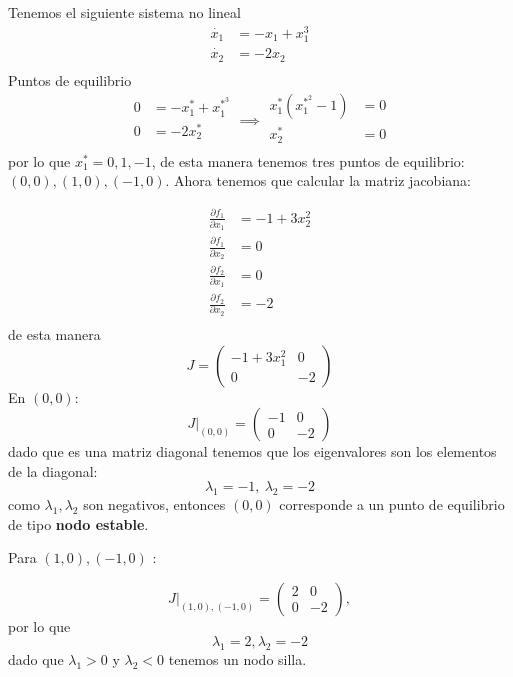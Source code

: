 \begin{ejemplo} \label{ejemplo lin6 1} 
  Tenemos el siguiente sistema no lineal
  $$
  \begin{aligned}
    \dot{x_1} &= -x_1+x_1^3 \\ 
    \dot{x_2} &= -2x_2 \\ 
  \end{aligned}
  $$
  Puntos de equilibrio
  $$
  \begin{aligned}
    0 &= -x_1^*+x_1^{*^3}\\
    0 &= -2x_2^{{*}} \\
  \end{aligned}
  \implies \begin{aligned}
    x_1^{{*}}(x_1^{{*}^2}-1) &= 0 \\ 
    x_2^{{*}} &= 0 \\ 
  \end{aligned}
  $$
  por lo que $x_1^*=0,1,-1$, de esta manera tenemos tres puntos de equilibrio: $(0,0),(1,0),(-1,0).$ Ahora tenemos que calcular la matriz jacobiana:

  $$
  \begin{aligned}
    \frac{\partial f_1}{\partial x_1} &=  -1 + 3x_2^2 \\
    \frac{\partial f_1}{\partial x_2} &= 0 \\ 
    \frac{\partial f_2}{\partial x_1} &= 0 \\ 
    \frac{\partial f_2}{\partial x_2} &= -2 \\ 
  \end{aligned}
  $$
  de esta manera $$
  J = \begin{pmatrix} -1+3x_1^2 & 0 \\ 0 & -2 \end{pmatrix} 
  $$
  En $(0,0)$:
  $$
  \left. J \right|_{(0,0)} = \begin{pmatrix} -1 & 0 \\ 0 & -2 \end{pmatrix}  
  $$ dado que es una matriz diagonal tenemos que los eigenvalores son los elementos de la diagonal:$$
  \lambda_1=-1,\ \lambda_2=-2
  $$
  como $\lambda_1,\lambda_2$ son negativos, entonces $(0,0)$ corresponde a un punto de equilibrio de tipo \textbf{nodo estable}.

  Para $(1,0),(-1,0)$ :

  $$
    \left. J \right|_{(1,0),(-1,0)} = \begin{pmatrix} 2 & 0 \\ 0 & -2 \end{pmatrix},
  $$
  por lo que $$
  \lambda_1=2,\lambda_2=-2
  $$
  dado que $\lambda_1>0$ y $\lambda_2<0$ tenemos un nodo silla. 


\end{ejemplo}
